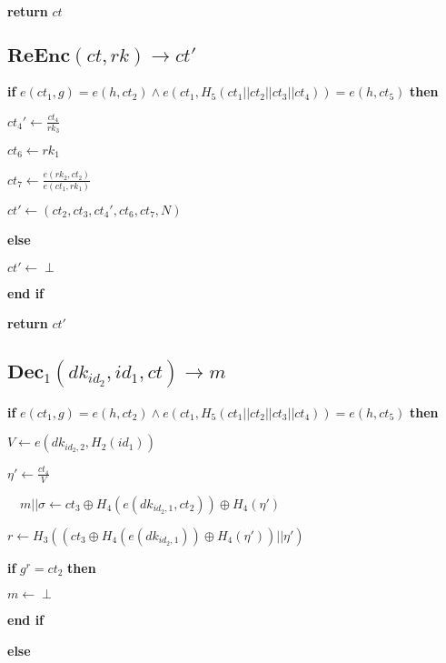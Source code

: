 \documentclass[a4paper]{article}
\begin{document}
\textbf{return} $\textit{ct}$

\subsection{$\textbf{ReEnc}(\textit{ct}, \textit{rk}) \rightarrow \textit{ct}'$}

\textbf{if} $e(\textit{ct}_1, g) = e(h, \textit{ct}_2) \land e(\textit{ct}_1, H_5(\textit{ct}_1 || \textit{ct}_2 || \textit{ct}_3 || \textit{ct}_4)) = e(h, \textit{ct}_5)$ \textbf{then}

	\quad$\textit{ct}_4' \gets \frac{\textit{ct}_4}{\textit{rk}_3}$

	\quad$\textit{ct}_6 \gets \textit{rk}_1$

	\quad$\textit{ct}_7 \gets \frac{e(\textit{rk}_2, \textit{ct}_2)}{e(\textit{ct}_1, \textit{rk}_1)}$

	\quad$\textit{ct}' \gets (\textit{ct}_2, \textit{ct}_3, \textit{ct}_4', \textit{ct}_6, \textit{ct}_7, N)$

\textbf{else}

	\quad$\textit{ct}' \gets \perp$

\textbf{end if}

\textbf{return} $\textit{ct}'$

\subsection{$\textbf{Dec}_1(\textit{dk}_{\textit{id}_2}, \textit{id}_1, \textit{ct}) \rightarrow m$}

\textbf{if} $e(\textit{ct}_1, g) = e(h, \textit{ct}_2) \land e(\textit{ct}_1, H_5(\textit{ct}_1 || \textit{ct}_2 || \textit{ct}_3 || \textit{ct}_4)) = e(h, \textit{ct}_5)$ \textbf{then}

	\quad$V \gets e(\textit{dk}_{\textit{id}_2, 2}, H_2(\textit{id}_1))$

	\quad$\eta' \gets \frac{\textit{ct}_4}{V}$

$\quad m || \sigma \gets \textit{ct}_3 \oplus H_4(e(\textit{dk}_{\textit{id}_2, 1}, \textit{ct}_2)) \oplus H_4(\eta')$

	\quad$r \gets H_3((\textit{ct}_3 \oplus H_4(e(\textit{dk}_{\textit{id}_2, 1})) \oplus H_4(\eta')) || \eta')$

	\quad\textbf{if} $g^r = \textit{ct}_2$ \textbf{then}

		\quad\quad$m \gets \perp$

\quad\textbf{end if}

\textbf{else}
\end{document}
